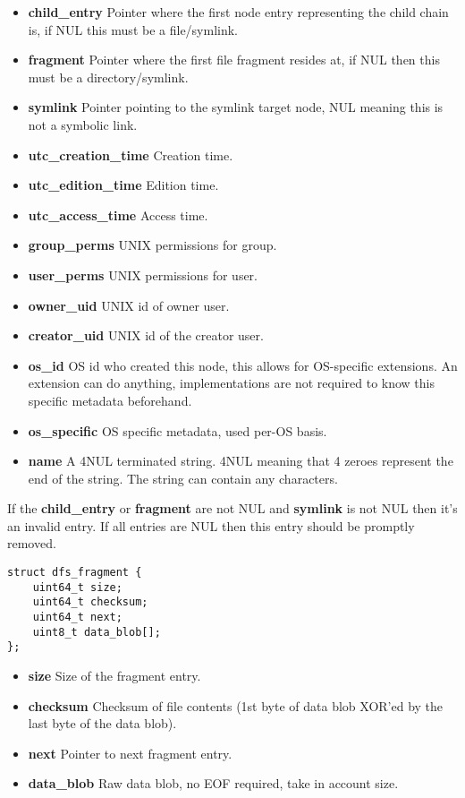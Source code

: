 \documentclass[12pt]{article}
\begin{document}
\begin{itemize}
	\item \textbf{child\_entry} Pointer where the first node entry representing the child chain is, if NUL this must be a file/symlink.
	\item \textbf{fragment} Pointer where the first file fragment resides at, if NUL then this must be a directory/symlink.
	\item \textbf{symlink} Pointer pointing to the symlink target node, NUL meaning this is not a symbolic link.
	\item \textbf{utc\_creation\_time} Creation time.
	\item \textbf{utc\_edition\_time} Edition time.
	\item \textbf{utc\_access\_time} Access time.
	\item \textbf{group\_perms} UNIX permissions for group.
	\item \textbf{user\_perms} UNIX permissions for user.
	\item \textbf{owner\_uid} UNIX id of owner user.
	\item \textbf{creator\_uid} UNIX id of the creator user.
	\item \textbf{os\_id} OS id who created this node, this allows for OS-specific extensions. An extension can do anything, implementations are not required to know this specific metadata beforehand.
	\item \textbf{os\_specific} OS specific metadata, used per-OS basis.
	\item \textbf{name} A 4NUL terminated string. 4NUL meaning that 4 zeroes represent the end of the string. The string can contain any characters.
\end{itemize}

If the \textbf{child\_entry} or \textbf{fragment} are not NUL and \textbf{symlink} is not NUL then it's an invalid entry. If all entries are NUL then this entry should be promptly removed.

\begin{verbatim}
struct dfs_fragment {
	uint64_t size;
	uint64_t checksum;
	uint64_t next;
	uint8_t data_blob[];
};
\end{verbatim}

\begin{itemize}
	\item \textbf{size} Size of the fragment entry.
	\item \textbf{checksum} Checksum of file contents (1st byte of data blob XOR'ed by the last byte of the data blob).
	\item \textbf{next} Pointer to next fragment entry.
	\item \textbf{data\_blob} Raw data blob, no EOF required, take in account size.
\end{itemize}
\end{document}
